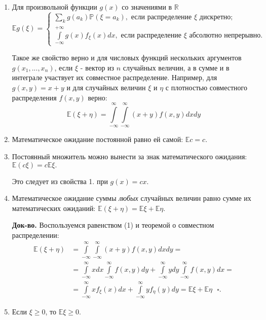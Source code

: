 \documentclass[oneside,final,14pt]{extreport}
\newcommand\myqed{{\bf Док-во.}}
\theoremstyle{definition}
\begin{document}
\begin{enumerate}
    \item Для произвольной функции $g(x)$ со значениями в $\mathbb{R}$
    $$\mathbb{E} g(\xi)=\left\{\begin{array}{l}\sum\limits_{k} g\left(a_{k}\right) \mathbb{P}\left(\xi=a_{k}\right), \text { если распределение } \xi \text { дискретно; } \\ \int\limits_{-\infty}^{+\infty} g(x) f_{\xi}(x) d x, \text { если распределение } \xi \text { абсолютно непрерывно. }\end{array}\right.$$
    
    Такое же свойство верно и для числовых функций нескольких аргументов $g(x_1, ...,x_n)$, если $\xi$ - вектор из $n$ случайных величин, а в сумме и в интеграле участвует их совместное распределение. Например, для $g(x,y) = x + y$ и для случайных величин $\xi$ и $\eta$ с плотностью совместного распределения $f(x,y)$ верно: 
    \begin{equation}
        \mathbb{E}(\xi+\eta)=\int\limits_{-\infty}^{\infty} \int\limits_{-\infty}^{\infty}(x+y) f(x, y) d x d y
    \end{equation}
    
    \item Математическое ожидание постоянной равно ей самой: $\mathbb{E} c=c.$
    \item Постоянный множитель можно вынести за знак математического ожидания: $\mathbb{E}(c\xi) = c\mathbb{E}\xi.$
    
    Это следует из свойства 1. при $g(x) = cx$.
    \item Математическое ожидание суммы {\it любых} случайных величин равно сумме их математических ожиданий: $\mathbb{E}(\xi + \eta) = \mathbb{E}\xi + \mathbb{E}\eta.$
    
    \myqed{} Воспользуемся равенством (1) и теоремой о совместном распределении:
    $$\begin{aligned}
    \mathbb{E}(\xi+\eta) &=\int\limits_{-\infty}^{\infty} \int\limits_{-\infty}^{\infty}(x+y) f(x, y) d x d y=\\
    &=\int\limits_{-\infty}^{\infty} x d x \int\limits_{-\infty}^{\infty} f(x, y) d y+\int\limits_{-\infty}^{\infty} y d y \int\limits_{-\infty}^{\infty} f(x, y) d x=\\
    &=\int\limits_{-\infty}^{\infty} x f_{\xi}(x) d x+\int\limits_{-\infty}^{\infty} y f_{\eta}(y) d y=\mathbb{E} \xi+\mathbb{E} \eta ~~~ \square.
    \end{aligned}$$
    \item Если $\xi \geq 0$, то $\mathbb{E}\xi \geq 0.$
    

\end{enumerate}
\end{document}

